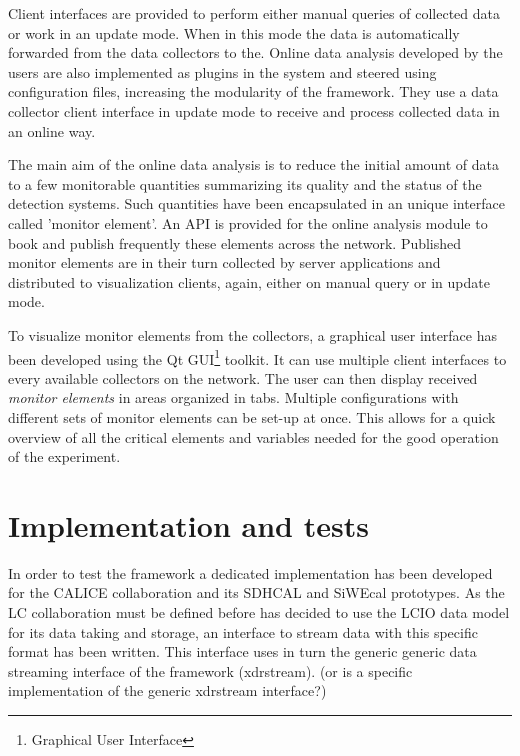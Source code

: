 \documentclass[conference]{IEEEtran}
\begin{document}
Client interfaces are provided to perform either manual queries of collected data or work in an update mode. When in this mode the data is automatically forwarded from the data collectors to the. Online data analysis developed by the users are also implemented as plugins in the system and steered using configuration files, increasing the modularity of the framework. They use a data collector client interface in update mode to receive and process collected data in an online way.

The main aim of the online data analysis is to reduce the initial amount of data to a few monitorable quantities summarizing its quality and the status of the detection systems. Such quantities have been encapsulated in an unique interface called 'monitor element'. An API is provided for the online analysis module to book and publish frequently these elements across the network. Published monitor elements are in their turn collected by server applications and distributed to visualization clients, again, either on manual query or in update mode.

To visualize monitor elements from the collectors, a graphical user interface has been developed using the Qt\cite{QT} GUI\footnote{Graphical User Interface} toolkit. It can use multiple client interfaces to every available collectors on the network. The user can then display received \textit{monitor elements} in areas organized in tabs. Multiple configurations with different sets of monitor elements can be set-up at once. This allows for a quick overview of all the critical elements and variables needed for the good operation of the experiment.


\section{Implementation and tests}
In order to test the framework a dedicated implementation has been developed for the CALICE collaboration and its SDHCAL and SiWEcal prototypes. As the LC collaboration {\color{red}must be defined before} has decided to use the LCIO data model for its data taking and storage, an interface to stream data with this specific format has been written. This interface uses in turn the generic generic data streaming interface of the framework (xdrstream). {\color{red}(or is a specific implementation of the generic xdrstream interface?)}
\end{document}
